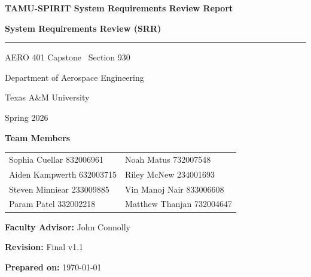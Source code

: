 \documentclass[conf]{new-aiaa}
\begin{document}
\begin{titlepage}
    \centering
    \vspace*{1.5cm}

    {\LARGE \textbf{TAMU-SPIRIT System Requirements Review Report}\par}
    \vspace{0.2cm}
    {\large \textbf{System Requirements Review (SRR)}\par}

    \vspace{0.6cm}
    \rule{0.8\textwidth}{0.4pt}\par
    \vspace{0.6cm}

    {\large AERO 401 Capstone \textbar\ Section 930\par}
    {\large Department of Aerospace Engineering\par}
    {\large Texas A\&M University\par}
    {\large Spring 2026\par}

    \vspace{0.8cm}
    {\large \textbf{Team Members}\par}
    \vspace{0.3cm}
    \begin{tabular}{@{}p{}p{}@{}}
    Sophia Cuellar \hfill 832006961 & Noah Matus \hfill 732007548 \\
    Aiden Kampwerth \hfill 632003715 & Riley McNew \hfill 234001693 \\
    Steven Minniear \hfill 233009885 & Vin Manoj Nair \hfill 833006608 \\
    Param Patel \hfill 332002218 & Matthew Thanjan \hfill 732004647 \\
    \end{tabular}

    \vspace{0.8cm}
    {\large \textbf{Faculty Advisor:} John Connolly\par}
    {\large \textbf{Revision:} Final v1.1\par}
    {\large \textbf{Prepared on:} \today\par}

    \vspace*{\fill}
\end{titlepage}

\tableofcontents
\clearpage
\listoftables
\clearpage
\end{document}
